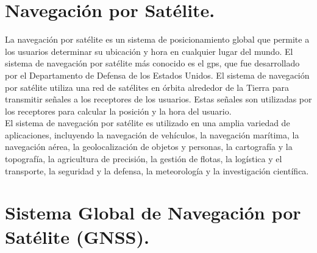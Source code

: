 \section*{\fontsize{12}{18}\selectfont Navegación por Satélite.}

\begin{justify}
    La navegación por satélite es un sistema de posicionamiento global que permite a los usuarios determinar su ubicación y hora en cualquier lugar del mundo.
    El sistema de navegación por satélite más conocido es el \gls{gps}, que fue desarrollado por el Departamento de Defensa de los Estados Unidos.
    El sistema de navegación por satélite utiliza una red de satélites en órbita alrededor de la Tierra para transmitir señales a los receptores de los usuarios.
    Estas señales son utilizadas por los receptores para calcular la posición y la hora del usuario.\\

    El sistema de navegación por satélite es utilizado en una amplia variedad de aplicaciones, incluyendo la navegación de vehículos, la navegación marítima,
    la navegación aérea, la geolocalización de objetos y personas, la cartografía y la topografía, la agricultura de precisión, la gestión de flotas,
    la logística y el transporte, la seguridad y la defensa, la meteorología y la investigación científica.
\end{justify}

\section*{\fontsize{12}{18}\selectfont Sistema Global de Navegación por Satélite (GNSS).}

